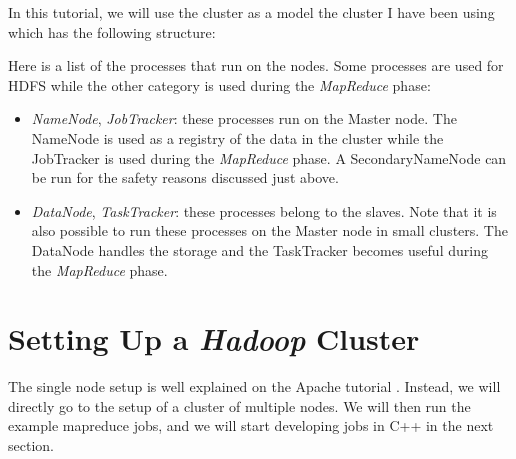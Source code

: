 \documentclass[a4paper, 12pt]{article}
\begin{document}
In this tutorial, we will use the cluster as a model the cluster I have been using which has the following structure:

\begin{center}
\end{center}

Here is a list of the processes that run on the nodes. Some processes are used for HDFS while the other category is used during the \textit{MapReduce} phase:
\begin{itemize}
  \item \textit{NameNode}, \textit{JobTracker}: these processes run on the Master node. The NameNode is used as a registry of the data in the cluster while the JobTracker is used during the \textit{MapReduce} phase. A SecondaryNameNode can be run for the safety reasons discussed just above.
  \item \textit{DataNode}, \textit{TaskTracker}: these processes belong to the slaves. Note that it is also possible to run these processes on the Master node in small clusters. The DataNode handles the storage and the TaskTracker becomes useful during the \textit{MapReduce} phase.
\end{itemize}

\section{Setting Up a \textit{Hadoop} Cluster}

The single node setup is well explained on the Apache tutorial \cite{hadoop_single_node_setup}. Instead, we will directly go to the setup of a cluster of multiple nodes. We will then run the example mapreduce jobs, and we will start developing jobs in C++ in the next section.
\end{document}
